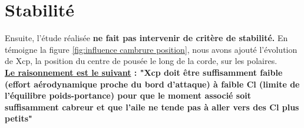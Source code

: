 \section{Stabilité}
\label{sec:Ch4.2}

Ensuite, l'étude réalisée \textbf{ne fait pas intervenir de critère de stabilité.} En témoigne la figure \ref{fig:influence cambrure position}, nous avons ajouté l'évolution de Xcp, la position du centre de pousée le long de la corde, sur les polaires.\\
\textbf{\underline{Le raisonnement est le suivant} : "Xcp doit être suffisamment faible (effort aérodynamique proche du bord d'attaque) à faible Cl (limite de l'équilibre poids-portance) pour que le moment associé soit suffisamment cabreur et que l'aile ne tende pas à aller vers des Cl plus petits"}\\ 


